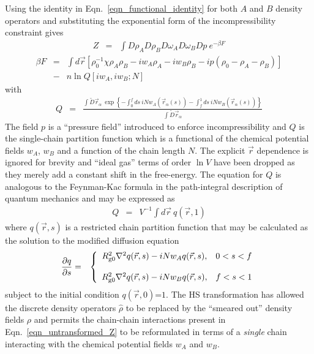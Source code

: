 \documentclass[onecolumn,amsmath,amssymb,floatfix]{elsart}
\begin{document}
Using the identity in Eqn.~\ref{eqn_functional_identity} for both $A$ and $B$ density
operators and substituting the exponential form of the incompressibility constraint
gives
%
 \begin{eqnarray}
 \label{eqn_transformed_Z}
 Z
 & = &
  \int D\rho_A D\rho_B D\omega_A D\omega_B Dp
  \ e^{-\beta F}
 \end{eqnarray}
%
%
 \begin{eqnarray}
 \label{eqn_free_energy_1}
 \beta F
 & = &
  \int d{\vec r}
   \left [
     \rho_0^{-1} \chi \rho_A \rho_B
      - i w_A \rho_A
      - i w_B \rho_B - i p (\rho_0 - \rho_A - \rho_B) \right ] \\
 & - & n \ln Q[i w_A,i w_B;N]
 \end{eqnarray}
%
with
 \begin{eqnarray}
 \label{eqn_single_chain_Q}
 Q
 & = &
  \frac{
  \int {\tilde D} {\vec r}_{\alpha} \
  \exp
  \left \lbrace
    - \int_0^f ds \ i N w_A({\vec r}_{\alpha}(s))
    - \int_f^1 ds \ i N w_B({\vec r}_{\alpha}(s))
  \right \rbrace}{\int {\tilde D} {\vec r}_{\alpha}}
 \end{eqnarray}
%
The field $p$ is a ``pressure field'' introduced to enforce
incompressibility and $Q$ is the single-chain partition function
which is a functional of the chemical potential fields $w_A$,
$w_B$ and a function of the chain length $N$.
The explicit ${\vec r}$ dependence is ignored for brevity and ``ideal gas'' terms of
order $\ln V$ have been dropped as they merely add a constant
shift in the free-energy.
The equation for $Q$ is analogous to the
Feynman-Kac formula in the path-integral description of quantum
mechanics \cite{feynman_hibbs65_book} and may be expressed as
%
 \begin{eqnarray}
 \label{eqn_Q}
  Q & = &
   V^{-1} \int d{\vec r} \ q({\vec r},1)
 \end{eqnarray}
%
where $q({\vec r},s)$ is a restricted chain partition function that
may be calculated as the solution to the modified diffusion equation
%
 \begin{eqnarray}
 \label{eqn_diffusion_for_q}
  \frac{\partial q}{\partial s}
   & = &
   \left \{ \begin{array}{cc}
    R_{{\rm g}0}^2 \nabla^2 q({\vec r},s) - i N w_A q({\vec r},s),
    & 0 < s < f \\
    \\
    R_{{\rm g}0}^2 \nabla^2 q({\vec r},s) - i N w_B q({\vec r},s),
    & f < s < 1
   \end{array} \right .
 \end{eqnarray}
%
subject to the initial condition $q({\vec r},0)$=$1$.
The HS transformation has allowed the discrete density operators ${\hat \rho}$
to be replaced by the ``smeared out'' density fields $\rho$
and permits the chain-chain interactions present in
Eqn.~\ref{eqn_untransformed_Z} to be reformulated in terms of a {\it single} chain
interacting with the chemical potential fields $w_A$ and $w_B$.
\end{document}
